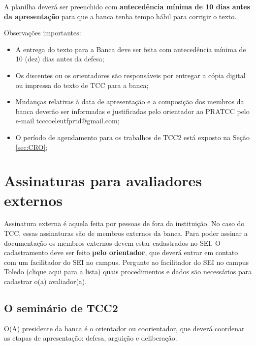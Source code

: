 \documentclass[a4paper, 12pt]{article}
\begin{document}
    A planilha deverá ser preenchido com \textbf{antecedência mínima de 10 dias antes da apresentação} para que a banca tenha tempo hábil para corrigir o texto.    
		
    Observações importantes:
    
    \begin{itemize}
    	\item A entrega do texto para a Banca deve ser feita com antecedência mínima de 10 (dez) dias antes da defesa;
    	\item Os discentes ou os orientadores são responsáveis por entregar a cópia digital ou impressa do texto de TCC para a banca;
    	\item Mudanças relativas à data de apresentação e a composição dos membros da banca deverão ser informadas e justificadas pelo orientador ao PRATCC pelo e-mail tcccoeleutfprtd@gmail.com;
    	\item O período de agendamento para os trabalhos de TCC2 está exposto na Seção \ref{sec:CRO};
    \end{itemize}

	\section{Assinaturas para avaliadores externos}
	
	Assinatura externa é aquela feita por pessoas de fora da instituição. No caso do TCC, essas assinaturas são de membros externos da banca. Para poder assinar a documentação os membros externos devem estar cadastrados no SEI. O cadastramento deve ser feito \textbf{pelo orientador}, que deverá entrar em contato com um facilitador do SEI no campus. Pergunte ao facilitador do SEI no campus Toledo \href{http://portal.utfpr.edu.br/servidores/servicos-servidor/sei/facilitadores}{(clique aqui para a lista)} quais procedimentos e dados são necessários para cadastrar o(a) avaliador(a).

	\subsection{O seminário de TCC2}
	
	O(A) presidente da banca é o orientador ou coorientador, que deverá coordenar as etapas de apresentação: defesa, arguição e deliberação. 
	
\end{document}
